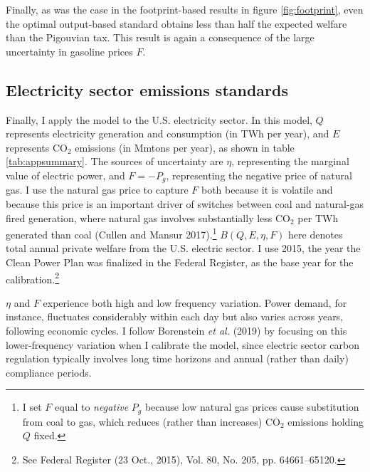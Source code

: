 \documentclass[12pt]{article}
\begin{document}
Finally, as was the case in the footprint-based results in figure \ref{fig:footprint}, even the optimal output-based standard obtains less than half the expected welfare than the Pigouvian tax. This result is again a consequence of the large uncertainty in gasoline prices $F$.



\subsection{Electricity sector emissions standards} \label{sec:elec}
Finally, I apply the model to the U.S. electricity sector. In this model, $Q$ represents electricity generation and consumption (in TWh per year), and $E$ represents CO$_2$ emissions (in Mmtons per year), as shown in table \ref{tab:appsummary}. The sources of uncertainty are $\eta$, representing the marginal value of electric power, and $F=-P_g$, representing the negative price of natural gas. I use the natural gas price to capture $F$ both because it is volatile and because this price is an important driver of switches between coal and natural-gas fired generation, where natural gas involves substantially less CO$_2$ per TWh generated than coal (Cullen and Mansur 2017).\footnote{I set $F$ equal to \emph{negative} $P_g$ because low natural gas prices cause substitution from coal to gas, which reduces (rather than increases) CO$_2$ emissions holding $Q$ fixed.} $B(Q,E,\eta,F)$ here denotes total annual private welfare from the U.S. electric sector. I use 2015, the year the Clean Power Plan was finalized in the Federal Register, as the base year for the calibration.\footnote{See Federal Register (23 Oct., 2015), Vol. 80, No. 205, pp. 64661--65120.}

$\eta$ and $F$ experience both high and low frequency variation. Power demand, for instance, fluctuates considerably within each day but also varies across years, following economic cycles. I follow Borenstein {\it et al.} (2019) by focusing on this lower-frequency variation when I calibrate the model, since electric sector carbon regulation typically involves long time horizons and annual (rather than daily) compliance periods.
\end{document}
